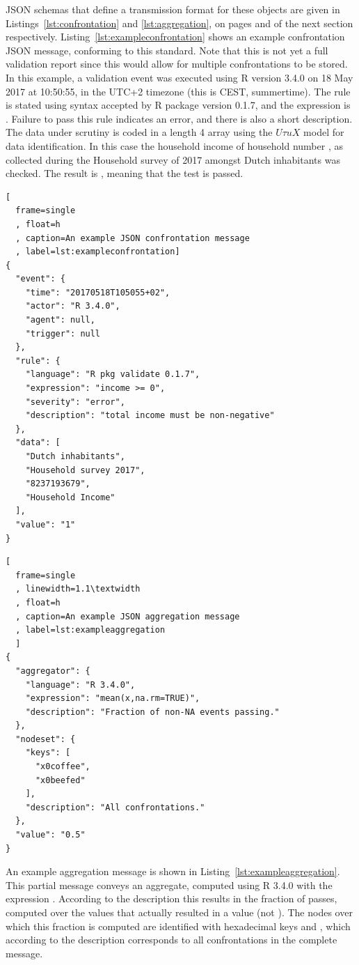 JSON schemas that define a transmission format for these objects are given in
Listings~\ref{lst:confrontation} and \ref{lst:aggregation}, on pages
\pageref{lst:confrontation} and \pageref{lst:aggregation} of the next section
respectively. Listing~\ref{lst:exampleconfrontation} shows an example
confrontation JSON message, conforming to this standard. Note that this is not
yet a full validation report since this would allow for multiple confrontations
to be stored.  In this example, a validation event was executed using R version
3.4.0 on 18 May 2017 at 10:50:55, in the UTC+2 timezone (this is CEST,
summertime).  The rule is stated using syntax accepted by R package
 version 0.1.7, and the expression is .
Failure to pass this rule indicates an error, and there is also a short
description. The data under scrutiny is coded in a length 4 array using the
$U\tau uX$ model for data identification.  In this case the household income of
household number , as collected during the Household survey
of 2017 amongst Dutch inhabitants was checked. The result is , meaning
that the test is passed.
%
\begin{lstlisting}[
  frame=single
  , float=h
  , caption=An example JSON confrontation message
  , label=lst:exampleconfrontation]
{
  "event": {
    "time": "20170518T105055+02",
    "actor": "R 3.4.0",
    "agent": null,
    "trigger": null
  },
  "rule": {
    "language": "R pkg validate 0.1.7",
    "expression": "income >= 0",
    "severity": "error",
    "description": "total income must be non-negative"
  },
  "data": [
    "Dutch inhabitants",
    "Household survey 2017",
    "8237193679",
    "Household Income"
  ],
  "value": "1"
}
\end{lstlisting}
\begin{lstlisting}[
  frame=single
  , linewidth=1.1\textwidth
  , float=h
  , caption=An example JSON aggregation message
  , label=lst:exampleaggregation
  ]
{
  "aggregator": {
    "language": "R 3.4.0",
    "expression": "mean(x,na.rm=TRUE)",
    "description": "Fraction of non-NA events passing."
  },
  "nodeset": {
    "keys": [
      "x0coffee",
      "x0beefed"
    ],
    "description": "All confrontations."
  },
  "value": "0.5"
}
\end{lstlisting}

An example aggregation message is shown in
Listing~\ref{lst:exampleaggregation}.  This partial message conveys an
aggregate, computed using R 3.4.0 with the expression . According to the description this results in the fraction of
passes, computed over the values that actually resulted in a value (not \na{}).
The nodes over which this fraction is computed are identified with hexadecimal
keys  and , which according to the description
corresponds to all confrontations in the complete message.
%


